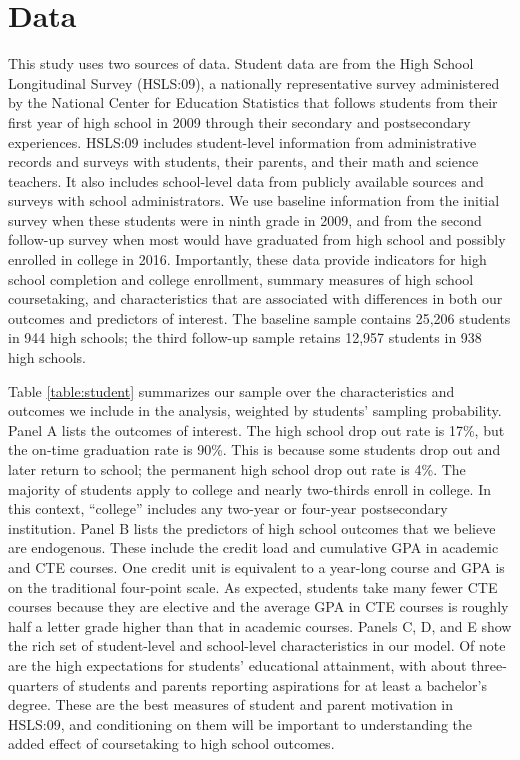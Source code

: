 \documentclass[letterpaper, 12pt]{article}
\begin{document}
\section{Data}

This study uses two sources of data. Student data are from the High School Longitudinal Survey (HSLS:09), a nationally representative survey administered by the National Center for Education Statistics that follows students from their first year of high school in 2009 through their secondary and postsecondary experiences. HSLS:09 includes student-level information from administrative records and surveys with students, their parents, and their math and science teachers. It also includes school-level data from publicly available sources and surveys with school administrators. We use baseline information from the initial survey when these students were in ninth grade in 2009, and from the second follow-up survey when most would have graduated from high school and possibly enrolled in college in 2016. Importantly, these data provide indicators for high school completion and college enrollment, summary measures of high school coursetaking, and characteristics that are associated with differences in both our outcomes and predictors of interest. The baseline sample contains 25,206 students in 944 high schools; the third follow-up sample retains 12,957 students in 938 high schools.

Table \ref{table:student} summarizes our sample over the characteristics and outcomes we include in the analysis, weighted by students' sampling probability. Panel A lists the outcomes of interest. The high school drop out rate is 17\%, but the on-time graduation rate is 90\%. This is because some students drop out and later return to school; the permanent high school drop out rate is 4\%. The majority of students apply to college and nearly two-thirds enroll in college. In this context, ``college'' includes any two-year or four-year postsecondary institution. Panel B lists the predictors of high school outcomes that we believe are endogenous. These include the credit load and cumulative GPA in academic and CTE courses. One credit unit is equivalent to a year-long course and GPA is on the traditional four-point scale. As expected, students take many fewer CTE courses because they are elective and the average GPA in CTE courses is roughly half a letter grade higher than that in academic courses. Panels C, D, and E show the rich set of student-level and school-level characteristics in our model. Of note are the high expectations for students' educational attainment, with about three-quarters of students and parents reporting aspirations for at least a bachelor's degree. These are the best measures of student and parent motivation in HSLS:09, and conditioning on them will be important to understanding the added effect of coursetaking to high school outcomes.
\end{document}
